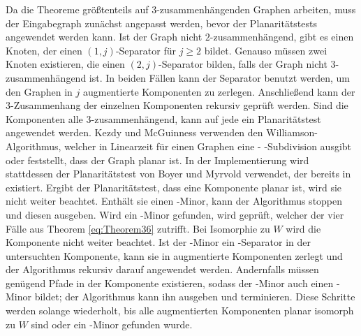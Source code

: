 Da die Theoreme größtenteils auf $3$-zusammenhängenden Graphen arbeiten, muss der Eingabegraph \ggf zunächst angepasst werden, bevor der Planaritätstests angewendet werden kann.
Ist der Graph nicht $2$-zusammenhängend, gibt es einen Knoten, der einen $(1, j)$-Separator für $j \geq 2$ bildet.
Genauso müssen zwei Knoten existieren, die einen $(2, j)$-Separator bilden, falls der Graph nicht $3$-zusammenhängend ist.
In beiden Fällen kann der Separator benutzt werden, um den Graphen in $j$ augmentierte Komponenten zu zerlegen.
Anschließend kann der $3$-Zusammenhang der einzelnen Komponenten rekursiv geprüft werden.
Sind die Komponenten alle $3$-zusammenhängend, kann auf jede ein Planaritätstest angewendet werden.
Kezdy und McGuinness verwenden den Williamson-Algorithmus\cite{Wil84}, welcher in Linearzeit für einen Graphen eine \kf- \bzw \kdd-Subdivision ausgibt oder feststellt, dass der Graph planar ist.
In der Implementierung wird stattdessen der Planaritätstest von Boyer und Myrvold\cite{BoM04} verwendet, der bereits in \OGDF existiert.
Ergibt der Planaritätstest, dass eine Komponente planar ist, wird sie nicht weiter beachtet.
Enthält sie einen \kf-Minor, kann der Algorithmus stoppen und diesen ausgeben.
Wird ein \kdd-Minor gefunden, wird geprüft, welcher der vier Fälle aus Theorem \ref{eq:Theorem36} zutrifft.
Bei Isomorphie zu $W$ wird die Komponente nicht weiter beachtet.
Ist der \kdd-Minor ein \dd-Separator in der untersuchten Komponente, kann sie in augmentierte Komponenten zerlegt und der Algorithmus rekursiv darauf angewendet werden.
Andernfalls müssen genügend Pfade in der Komponente existieren, sodass der \kdd-Minor auch einen \kf-Minor bildet; der Algorithmus kann ihn ausgeben und terminieren.
Diese Schritte werden solange wiederholt, bis alle augmentierten Komponenten planar \bzw isomorph zu $W$ sind oder ein \kf-Minor gefunden wurde.

